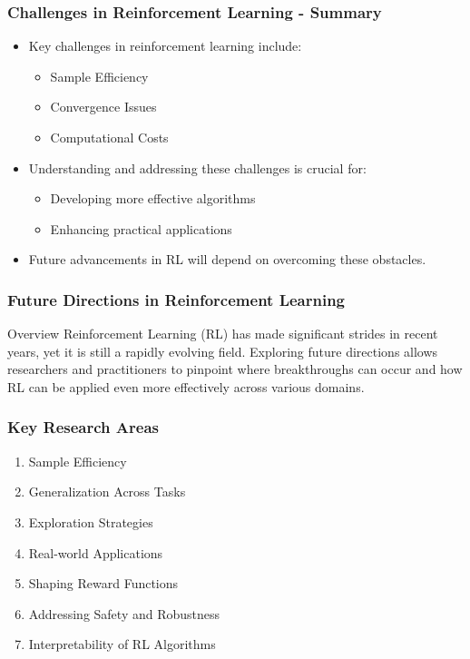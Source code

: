 \documentclass[aspectratio=169]{beamer}
\begin{document}
\begin{frame}[fragile]
    \frametitle{Challenges in Reinforcement Learning - Summary}
    \begin{itemize}
        \item Key challenges in reinforcement learning include:
        \begin{itemize}
            \item Sample Efficiency
            \item Convergence Issues
            \item Computational Costs
        \end{itemize}
        \item Understanding and addressing these challenges is crucial for:
        \begin{itemize}
            \item Developing more effective algorithms
            \item Enhancing practical applications
        \end{itemize}
        \item Future advancements in RL will depend on overcoming these obstacles.
    \end{itemize}
\end{frame}

\begin{frame}
    \frametitle{Future Directions in Reinforcement Learning}
    \begin{block}{Overview}
        Reinforcement Learning (RL) has made significant strides in recent years, yet it is still a rapidly evolving field. Exploring future directions allows researchers and practitioners to pinpoint where breakthroughs can occur and how RL can be applied even more effectively across various domains.
    \end{block}
\end{frame}

\begin{frame}
    \frametitle{Key Research Areas}
    \begin{enumerate}
        \item Sample Efficiency
        \item Generalization Across Tasks
        \item Exploration Strategies
        \item Real-world Applications
        \item Shaping Reward Functions
        \item Addressing Safety and Robustness
        \item Interpretability of RL Algorithms
    \end{enumerate}
\end{frame}
\end{document}
